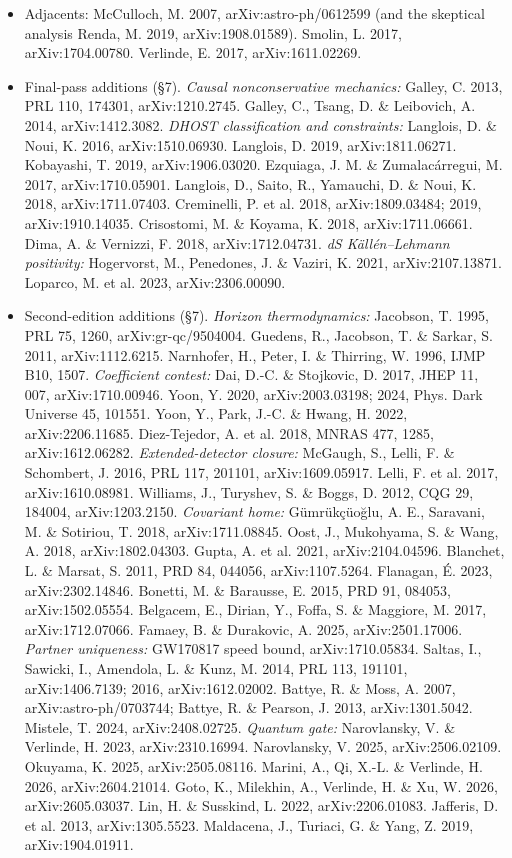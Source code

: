 \documentclass[11pt,a4paper]{article}
\begin{document}
\begin{itemize}
\item Adjacents: McCulloch, M. 2007, arXiv:astro-ph/0612599 (and the skeptical analysis Renda, M. 2019, arXiv:1908.01589). Smolin, L. 2017, arXiv:1704.00780. Verlinde, E. 2017, arXiv:1611.02269.

\item Final-pass additions (\S{}7). \emph{Causal nonconservative mechanics:} Galley, C. 2013, PRL 110, 174301, arXiv:1210.2745. Galley, C., Tsang, D. \& Leibovich, A. 2014, arXiv:1412.3082. \emph{DHOST classification and constraints:} Langlois, D. \& Noui, K. 2016, arXiv:1510.06930. Langlois, D. 2019, arXiv:1811.06271. Kobayashi, T. 2019, arXiv:1906.03020. Ezquiaga, J. M. \& Zumalac\'arregui, M. 2017, arXiv:1710.05901. Langlois, D., Saito, R., Yamauchi, D. \& Noui, K. 2018, arXiv:1711.07403. Creminelli, P. et al. 2018, arXiv:1809.03484; 2019, arXiv:1910.14035. Crisostomi, M. \& Koyama, K. 2018, arXiv:1711.06661. Dima, A. \& Vernizzi, F. 2018, arXiv:1712.04731. \emph{dS K\"all\'en--Lehmann positivity:} Hogervorst, M., Penedones, J. \& Vaziri, K. 2021, arXiv:2107.13871. Loparco, M. et al. 2023, arXiv:2306.00090.

\item Second-edition additions (\S{}7). \emph{Horizon thermodynamics:} Jacobson, T. 1995, PRL 75, 1260, arXiv:gr-qc/9504004. Guedens, R., Jacobson, T. \& Sarkar, S. 2011, arXiv:1112.6215. Narnhofer, H., Peter, I. \& Thirring, W. 1996, IJMP B10, 1507. \emph{Coefficient contest:} Dai, D.-C. \& Stojkovic, D. 2017, JHEP 11, 007, arXiv:1710.00946. Yoon, Y. 2020, arXiv:2003.03198; 2024, Phys. Dark Universe 45, 101551. Yoon, Y., Park, J.-C. \& Hwang, H. 2022, arXiv:2206.11685. Diez-Tejedor, A. et al. 2018, MNRAS 477, 1285, arXiv:1612.06282. \emph{Extended-detector closure:} McGaugh, S., Lelli, F. \& Schombert, J. 2016, PRL 117, 201101, arXiv:1609.05917. Lelli, F. et al. 2017, arXiv:1610.08981. Williams, J., Turyshev, S. \& Boggs, D. 2012, CQG 29, 184004, arXiv:1203.2150. \emph{Covariant home:} G\"umr\"uk\c{c}\"uo\u{g}lu, A. E., Saravani, M. \& Sotiriou, T. 2018, arXiv:1711.08845. Oost, J., Mukohyama, S. \& Wang, A. 2018, arXiv:1802.04303. Gupta, A. et al. 2021, arXiv:2104.04596. Blanchet, L. \& Marsat, S. 2011, PRD 84, 044056, arXiv:1107.5264. Flanagan, \'E. 2023, arXiv:2302.14846. Bonetti, M. \& Barausse, E. 2015, PRD 91, 084053, arXiv:1502.05554. Belgacem, E., Dirian, Y., Foffa, S. \& Maggiore, M. 2017, arXiv:1712.07066. Famaey, B. \& Durakovic, A. 2025, arXiv:2501.17006. \emph{Partner uniqueness:} GW170817 speed bound, arXiv:1710.05834. Saltas, I., Sawicki, I., Amendola, L. \& Kunz, M. 2014, PRL 113, 191101, arXiv:1406.7139; 2016, arXiv:1612.02002. Battye, R. \& Moss, A. 2007, arXiv:astro-ph/0703744; Battye, R. \& Pearson, J. 2013, arXiv:1301.5042. Mistele, T. 2024, arXiv:2408.02725. \emph{Quantum gate:} Narovlansky, V. \& Verlinde, H. 2023, arXiv:2310.16994. Narovlansky, V. 2025, arXiv:2506.02109. Okuyama, K. 2025, arXiv:2505.08116. Marini, A., Qi, X.-L. \& Verlinde, H. 2026, arXiv:2604.21014. Goto, K., Milekhin, A., Verlinde, H. \& Xu, W. 2026, arXiv:2605.03037. Lin, H. \& Susskind, L. 2022, arXiv:2206.01083. Jafferis, D. et al. 2013, arXiv:1305.5523. Maldacena, J., Turiaci, G. \& Yang, Z. 2019, arXiv:1904.01911.


\end{itemize}
\end{document}
